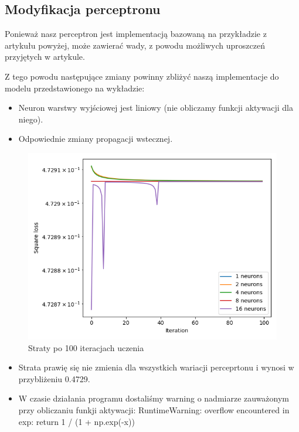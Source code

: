 \documentclass[12pt,a4paper]{article}
\begin{document}
\pagebreak

\subsection{Modyfikacja perceptronu}

Ponieważ nasz perceptron jest implementacją bazowaną na przykładzie z artykułu powyżej, może zawierać wady, z powodu możliwych uproszczeń przyjętych w artykule.

Z tego powodu następujące zmiany powinny zbliżyć naszą implementacje do modelu przedstawionego na wykładzie:

\begin{itemize}
  \item   Neuron warstwy wyjściowej jest liniowy (nie obliczamy funkcji aktywacji dla niego).
  \item   Odpowiednie zmiany propagacji wstecznej.
\end{itemize}

\begin{figure}[h]
  \centering
  \includegraphics[width=1.0\textwidth]{charts/no_output_activation/noactiv100iter_lr1.png}
  \caption{Straty po 100 iteracjach uczenia}
  \label{}
\end{figure}

\begin{itemize}
  \item   Strata prawię się nie zmienia dla wszystkich wariacji perceprtonu i wynosi w przybliżeniu 0.4729.
  \item   W czasie działania programu dostaliśmy warning o nadmiarze zauważonym przy obliczaniu funkji aktywacji: 
RuntimeWarning: overflow encountered in exp: return 1 / (1 + np.exp(-x))
\end{itemize}
\end{document}
